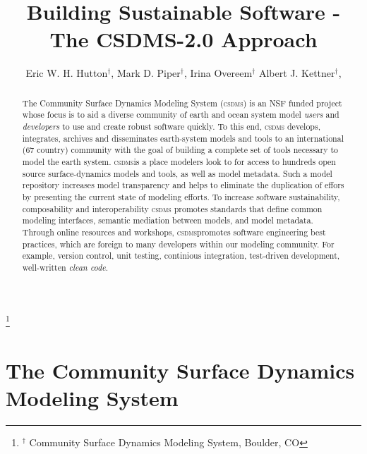 \documentclass[11pt, oneside]{amsart}
\DeclareRobustCommand{\csdms}{\textsc{csdms}}
\begin{document}
\title[]{Building Sustainable Software - The CSDMS-2.0 Approach}

\author{
  Eric W. H. Hutton$^{\dag}$,
  Mark D. Piper$^{\dag}$,
  Irina Overeem$^{\dag}$
  Albert J. Kettner$^{\dag}$,
}

\thanks{{}$^{\dag}$ Community Surface Dynamics Modeling System, Boulder, CO}

\begin{abstract}

The Community Surface Dynamics Modeling System (\csdms{}) is an NSF funded
project whose focus is to aid a diverse community of earth and ocean system
model \emph{users} and \emph{developers} to use and create robust software
quickly.  To this end, \csdms{} develops, integrates, archives and disseminates
earth-system models and tools to an international (67 country) community
with the goal of building a complete set of tools necessary to model the
earth system. \csdms is a place modelers look to for access to hundreds open
source surface-dynamics models and tools, as well as model metadata. Such a
model repository increases model transparency and helps to eliminate the
duplication of effors by presenting the current state of modeling efforts.
To increase software sustainability, composability and interoperability \csdms
promotes standards that define common modeling interfaces, semantic mediation
between models, and model metadata. Through online resources and workshops,
\csdms promotes software engineering best practices, which are foreign to many
developers within our modeling community. For example, version control, unit
testing, continious integration, test-driven development, well-written
\emph{clean code}.

\end{abstract}

\maketitle

\section{The Community Surface Dynamics Modeling System}
\end{document}
